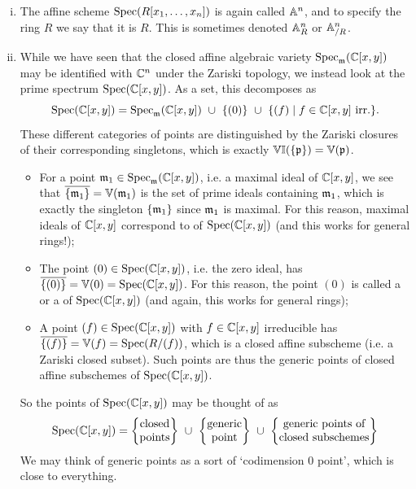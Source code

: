 \begin{eg}
	\begin{enumerate}[(i)]
		\item The affine scheme $\mathrm{Spec}(R[x_1,\ldots,x_n])$ is again called  $\mathbb{A}^n$, and to specify the ring $R$ we say that it is  $R$. This is sometimes denoted $\mathbb{A}^n_R$ or $\mathbb{A}^n_{/R}$.
		\item While we have seen that the closed affine algebraic variety $\mathrm{Spec}_{\mathfrak{m}}(\mathbb{C}[x,y])$ may be identified with $\mathbb{C}^n$ under the Zariski topology, we instead look at the prime spectrum $\mathrm{Spec}(\mathbb{C}[x,y])$. As a set, this decomposes as 
			\[
				\mathrm{Spec}(\mathbb{C}[x,y]) = \mathrm{Spec}_{\mathfrak{m}} (\mathbb{C}[x,y]) \,\, \cup \,\, \{(0)\} \,\, \cup \,\, \{(f) \mid f \in \mathbb{C}[x,y] \text{ irr.}\}.
			\]
			These different categories of points are distinguished by the Zariski closures of their corresponding singletons, which is exactly $\mathbb{V}\mathbb{I}(\{\mathfrak{p}\})=\mathbb{V}(\mathfrak{p})$.
			\begin{itemize}
				\item For a point $\mathfrak{m}_1 \in \mathrm{Spec}_{\mathfrak{m}}(\mathbb{C}[x,y])$, i.e. a maximal ideal of $\mathbb{C}[x,y]$, we see that $\overline{\{\mathfrak{m}_1\}} = \mathbb{V}(\mathfrak{m}_1)$ is the set of prime ideals containing $\mathfrak{m}_1$, which is exactly the singleton $\{\mathfrak{m}_1\}$ since $\mathfrak{m}_1$ is maximal. For this reason, maximal ideals of $\mathbb{C}[x,y]$ correspond to  of $\mathrm{Spec}(\mathbb{C}[x,y])$ (and this works for general rings!);
				\item The point $(0) \in \mathrm{Spec}(\mathbb{C}[x,y])$, i.e. the zero ideal, has $\overline{\{(0)\}} = \mathbb{V}(0) = \mathrm{Spec}(\mathbb{C}[x,y])$. For this reason, the point $(0)$ is called a  or a  of $\mathrm{Spec}(\mathbb{C}[x,y])$ (and again, this works for general rings);
				\item A point $(f) \in \mathrm{Spec}(\mathbb{C}[x,y])$ with $f \in \mathbb{C}[x,y]$ irreducible has $\overline{\{(f)\}} = \mathbb{V}(f) = \mathrm{Spec}(R/(f))$, which is a closed affine subscheme (i.e. a Zariski closed subset). Such points are thus the generic points of closed affine subschemes of $\mathrm{Spec}(\mathbb{C}[x,y])$.
			\end{itemize}
			So the points of $\mathrm{Spec}(\mathbb{C}[x,y])$ may be thought of as
			\[
				\Spec(\C[x,y]) = \left\{\bettersubstack{\text{closed} \\ \text{points}}\right\} \,\, \cup \,\, \left\{\bettersubstack{\text{generic} \\ \text{point}}\right\} \,\, \cup \,\, \left\{\bettersubstack{\text{generic points of} \\ \text{closed subschemes}}\right\}
			\]
			We may think of generic points as a sort of `codimension 0 point', which is close to everything. 

\end{enumerate}
\end{eg}

